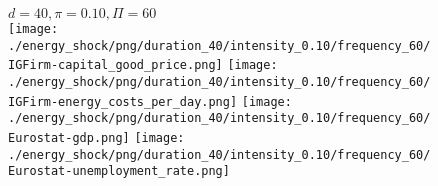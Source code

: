 \begin{figure}[ht!]
\centering\leavevmode
\begin{minipage}{17cm}
\centering\leavevmode
{$d=40, \pi=0.10, \Pi=60$}\\
\texttt{[image: ./energy\_shock/png/duration\_40/intensity\_0.10/frequency\_60/IGFirm-capital\_good\_price.png]}
\texttt{[image: ./energy\_shock/png/duration\_40/intensity\_0.10/frequency\_60/IGFirm-energy\_costs\_per\_day.png]}
\texttt{[image: ./energy\_shock/png/duration\_40/intensity\_0.10/frequency\_60/Eurostat-gdp.png]}
\texttt{[image: ./energy\_shock/png/duration\_40/intensity\_0.10/frequency\_60/Eurostat-unemployment\_rate.png]}
\end{minipage}
\end{figure}

